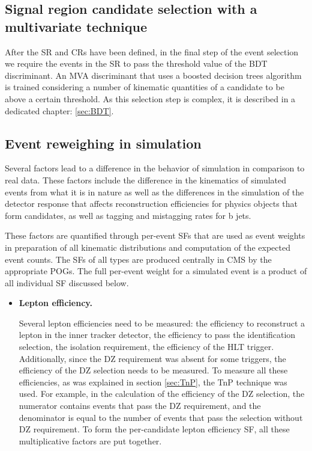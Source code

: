 \begin{small}
\subsection{Signal region candidate selection with a multivariate technique}

After the SR and CRs have been defined, in the final step of the event selection we require the events in the SR to pass the threshold value of the BDT discriminant. An MVA discriminant that uses a boosted decision trees algorithm is trained considering a number of kinematic quantities of a candidate to be above a certain threshold. As this selection step is complex, it is described in a dedicated chapter: \ref{sec:BDT}.

\subsection{Event reweighing in simulation}

Several factors lead to a difference in the behavior of simulation in comparison to real data. These factors include the difference in the kinematics of simulated events from what it is in nature as well as the differences in the simulation of the detector response that affects reconstruction efficiencies for physics objects that form candidates, as well as tagging and mistagging rates for b jets. 

These factors are quantified through per-event SFs that are used as event weights in preparation of all kinematic distributions and computation of the expected event counts. The SFs of all types are produced centrally in CMS by the appropriate POGs. The full per-event weight for a simulated event is a product of all individual SF discussed below.

\begin{itemize}

\item{\bfseries Lepton efficiency.} 

Several lepton efficiencies need to be measured: the efficiency to reconstruct a lepton in the inner tracker detector, the efficiency to pass the identification selection, the isolation requirement, the efficiency of the HLT trigger. Additionally, since the DZ requirement was absent for some triggers, the efficiency of the DZ selection needs to be measured. To measure all these efficiencies, as was explained in section \ref{sec:TnP}, the TnP technique was used. For example, in the calculation of the efficiency of the DZ selection, the numerator contains events that pass the DZ requirement, and the denominator is equal to the number of events that pass the selection without DZ requirement. To form the per-candidate lepton efficiency SF, all these multiplicative factors are put together.


\end{itemize}
\end{small}
